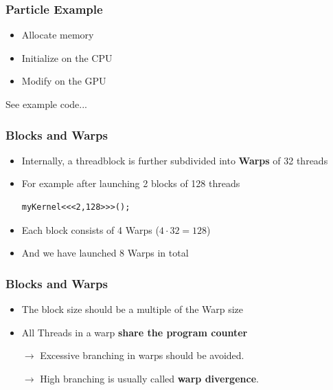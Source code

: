 \documentclass[aspectratio=169]{beamer}
\begin{document}
\begin{frame}[fragile]
	\frametitle{Particle Example}
	\begin{itemize}
		\item Allocate memory
		\item Initialize on the CPU
		\item Modify on the GPU
	\end{itemize}
	
	See example code...
\end{frame}

\begin{frame}[fragile]
	\frametitle{Blocks and Warps}
\begin{itemize}
\item Internally, a threadblock is further subdivided into \textbf{Warps} of 32 threads
\item For example after launching 2 blocks of 128 threads
\begin{lstlisting}
myKernel<<<2,128>>>();
\end{lstlisting}
\item Each block consists of 4 Warps ($4\cdot 32 = 128$)
\item And we have launched 8 Warps in total
\end{itemize}
\end{frame}

\begin{frame}[fragile]
	\frametitle{Blocks and Warps}
\begin{itemize}
	\item The block size should be a multiple of the Warp size
	\item All Threads in a warp \textbf{share the program counter}
	\item [$\rightarrow$] Excessive branching in warps should be avoided.
	\item [$\rightarrow$] High branching is usually called \textbf{warp divergence}.
\end{itemize}


\end{frame}
\end{document}
